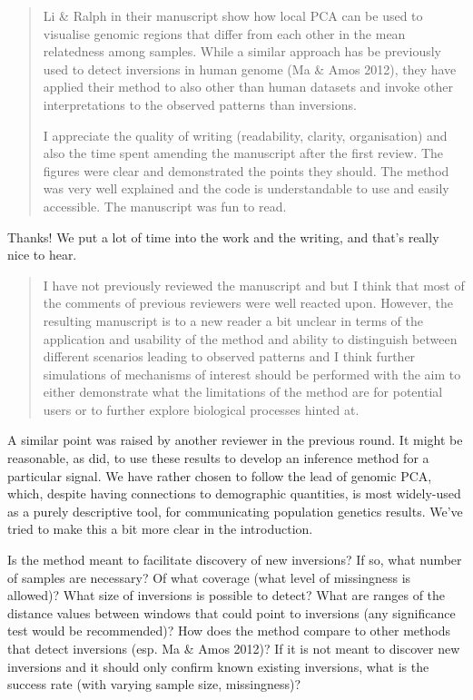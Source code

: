 

\begin{quote}
    Li \& Ralph in their manuscript show how local PCA can be used to visualise genomic regions that differ from each other in the mean relatedness among samples. While a similar approach has be previously used to detect inversions in human genome (Ma \& Amos 2012), they have applied their method to also other than human datasets and invoke other interpretations to the observed patterns than inversions.

    I appreciate the quality of writing (readability, clarity, organisation) and also the time spent amending the manuscript after the first review. The figures were clear and demonstrated the points they should. The method was very well explained and the code is understandable to use and easily accessible. The manuscript was fun to read.
\end{quote}

Thanks!  We put a lot of time into the work and the writing,
and that's really nice to hear.

\begin{quote}
    I have not previously reviewed the manuscript and but I think that most of the comments of previous reviewers were well reacted upon. However, the resulting manuscript is to a new reader a bit unclear in terms of the application and usability of the method and ability to distinguish between different scenarios leading to observed patterns and I think further simulations of mechanisms of interest should be performed with the aim to either demonstrate what the limitations of the method are for potential users or to further explore biological processes hinted at.
\end{quote}

A similar point was raised by another reviewer in the previous round.
It might be reasonable, as \citet{ma2012investigation} did,
to use these results to develop an inference method for a particular signal.
We have rather chosen to follow the lead of genomic PCA,
which, despite having connections to demographic quantities,
is most widely-used as a purely descriptive tool,
for communicating population genetics results.
We've tried to make this a bit more clear in the introduction. 


\begin{point}{}
    Is the method meant to facilitate discovery of new inversions? If so, what number of samples are necessary? Of what coverage (what level of missingness is allowed)? What size of inversions is possible to detect? What are ranges of the distance values between windows that could point to inversions (any significance test would be recommended)? How does the method compare to other methods that detect inversions (esp. Ma \& Amos 2012)? If it is not meant to discover new inversions and it should only confirm known existing inversions, what is the success rate (with varying sample size, missingness)?
\end{point}

